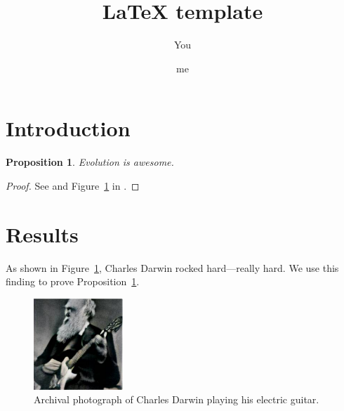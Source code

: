 \documentclass{article}
\title{\LaTeX{} template}
\author{You \and me}
\newtheorem{prop}{Proposition}
\begin{document}
\maketitle

\section*{Introduction}\label{sec:intro}

\begin{prop}\label{prop:evo}
Evolution is awesome.
\end{prop}
\begin{proof}
  See \cite{darwin1909origin} and Figure~\ref{fig:darwin} in .
\end{proof}

\section*{Results}\label{sec:results}

As shown in Figure~\ref{fig:darwin}, Charles Darwin rocked hard---really hard.
We use this finding to prove Proposition~\ref{prop:evo}.

\begin{figure}[h]
 \centering
 \includegraphics[width=0.3\textwidth]{figures/darwin-rock}
 \caption{Archival photograph of Charles Darwin playing his electric guitar.}
 \label{fig:darwin}
\end{figure}




\end{document}
